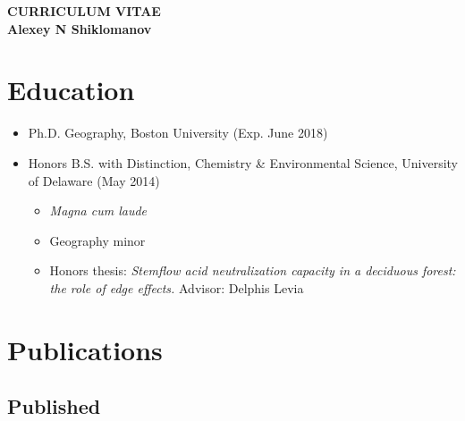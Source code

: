 
\thispagestyle{empty}

\begin{center}
{\LARGE {\bf CURRICULUM VITAE}}\\
\vspace{0.5in}
{\large {\bf Alexey N Shiklomanov}}
\end{center}

\section*{Education}

\begin{itemize}
  \item Ph.D. Geography, Boston University (Exp. June 2018)
  \item Honors B.S. with Distinction, Chemistry \& Environmental Science, University of Delaware (May 2014)
    \begin{itemize}
      \item \textit{Magna cum laude}
      \item Geography minor
      \item Honors thesis: \textit{Stemflow acid neutralization capacity in a deciduous forest: the role of edge effects.} Advisor: Delphis Levia
    \end{itemize}
\end{itemize}

\section*{Publications}

\subsection*{Published}

